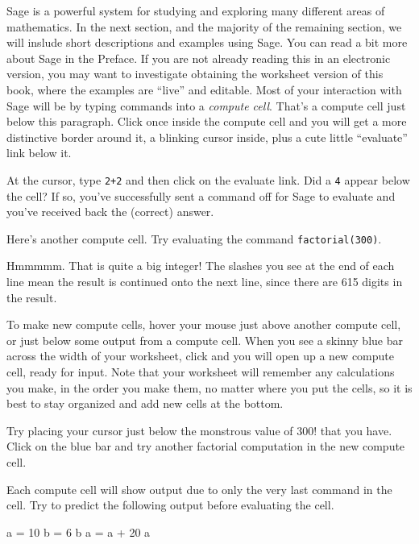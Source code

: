 Sage is a powerful system for studying and exploring many different areas of mathematics.  In the next section, and the majority of the remaining section, we will inslude short descriptions and examples using Sage.  You can read a bit more about Sage in the Preface.  If you are not already reading this in an electronic version, you may want to investigate obtaining the worksheet version of this book, where the examples are ``live'' and editable.
%
Most of your interaction with Sage will be by typing commands into a \emph{compute cell}.  That's a compute cell just below this paragraph.  Click once inside the compute cell and you will get a more distinctive border around it, a blinking cursor inside, plus a cute little ``evaluate'' link below it.\par
%
\begin{sageverbatim}

\end{sageverbatim}
%
At the cursor, type \verb?2+2? and then click on the evaluate link.  Did a \verb?4? appear below the cell?  If so, you've successfully sent a command off for Sage to evaluate and you've received back the (correct) answer.\par
%
Here's another compute cell.  Try evaluating the command \verb?factorial(300)?.
%
\begin{sageverbatim}

\end{sageverbatim}
%
Hmmmmm.  That is quite a big integer!  The slashes you see at the end of each line mean the result is continued onto the next line, since there are 615 digits in the result.\par
%
To make new compute cells, hover your mouse just above another compute cell, or just below some output from a compute cell.  When you see a skinny blue bar across the width of your worksheet, click and you will open up a new compute cell, ready for input.  Note that your worksheet will remember any calculations you make, in the order you make them, no matter where you put the cells, so it is best to stay organized and add new cells at the bottom.\par
%
Try placing your cursor just below the monstrous value of $300!$ that you have.  Click on the blue bar and try another factorial computation in the new compute cell.\par
%
Each compute cell will show output due to only the very last command in the cell.  Try to predict the following output before evaluating the cell.
%
\begin{sageverbatim}
a = 10
b = 6
b
a = a + 20
a
\end{sageverbatim}
